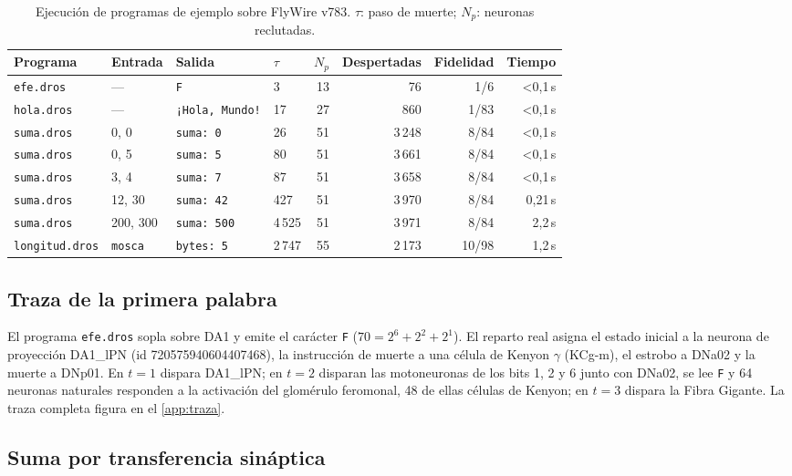 \documentclass[11pt,a4paper]{article}
\theoremstyle{plain}
\theoremstyle{definition}
\theoremstyle{remark}
\begin{document}
\begin{table}[t]
\centering
\caption{Ejecución de programas de ejemplo sobre FlyWire v783. $\tau$: paso de
muerte; $N_p$: neuronas reclutadas.}
\label{tab:resultados}
\small
\begin{tabular}{@{}llllrrrr@{}}
\toprule
Programa & Entrada & Salida & $\tau$ & $N_p$ & Despertadas & Fidelidad & Tiempo \\
\midrule
\texttt{efe.dros}  & ---      & \texttt{F}            &    3 & 13 &     76 & 1/6   & <0,1\,s \\
\texttt{hola.dros} & ---      & \texttt{¡Hola, Mundo!} &   17 & 27 &    860 & 1/83  & <0,1\,s \\
\texttt{suma.dros} & 0, 0     & \texttt{suma: 0}      &   26 & 51 & 3\,248 & 8/84  & <0,1\,s \\
\texttt{suma.dros} & 0, 5     & \texttt{suma: 5}      &   80 & 51 & 3\,661 & 8/84  & <0,1\,s \\
\texttt{suma.dros} & 3, 4     & \texttt{suma: 7}      &   87 & 51 & 3\,658 & 8/84  & <0,1\,s \\
\texttt{suma.dros} & 12, 30   & \texttt{suma: 42}     &  427 & 51 & 3\,970 & 8/84  & 0,21\,s \\
\texttt{suma.dros} & 200, 300 & \texttt{suma: 500}    & 4\,525 & 51 & 3\,971 & 8/84 & 2,2\,s \\
\texttt{longitud.dros} & \texttt{mosca} & \texttt{bytes: 5} & 2\,747 & 55 & 2\,173 & 10/98 & 1,2\,s \\
\bottomrule
\end{tabular}
\end{table}

\subsection{Traza de la primera palabra}

El programa \texttt{efe.dros} sopla sobre DA1 y emite el carácter \texttt{F}
($70=2^6+2^2+2^1$). El reparto real asigna el estado inicial a la neurona de
proyección DA1\_lPN (id 720575940604407468), la instrucción de muerte a una
célula de Kenyon $\gamma$ (KCg-m), el estrobo a DNa02 y la muerte a DNp01. En
$t=1$ dispara DA1\_lPN; en $t=2$ disparan las motoneuronas de los bits 1, 2 y
6 junto con DNa02, se lee \texttt{F} y 64 neuronas naturales responden a la
activación del glomérulo feromonal, 48 de ellas células de Kenyon; en $t=3$
dispara la Fibra Gigante. La traza completa figura en el \cref{app:traza}.

\subsection{Suma por transferencia sináptica}
\end{document}

